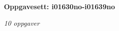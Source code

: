 \centerline{\bf Oppgavesett: i01630no-i01639no}
\vskip 10pt
\centerline{\it 10 oppgaver}\vskip 10pt
\vskip 10pt
